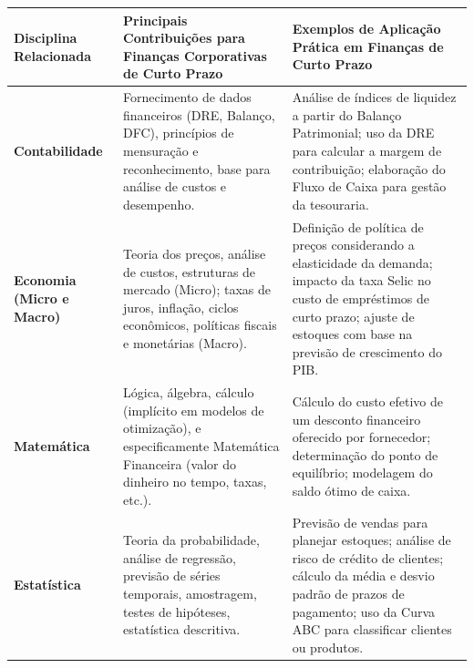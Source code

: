 \documentclass[
  a4paper,
]{book}
\begin{document}
\begin{longtable}[]{@{}
  >{\raggedright\arraybackslash}p{}
  >{\raggedright\arraybackslash}p{}
  >{\raggedright\arraybackslash}p{}@{}}
\toprule\noalign{}
\begin{minipage}[b]{\linewidth}\raggedright
Disciplina Relacionada
\end{minipage} & \begin{minipage}[b]{\linewidth}\raggedright
Principais Contribuições para Finanças Corporativas de Curto Prazo
\end{minipage} & \begin{minipage}[b]{\linewidth}\raggedright
Exemplos de Aplicação Prática em Finanças de Curto Prazo
\end{minipage} \\
\midrule\noalign{}
\endhead
\bottomrule\noalign{}
\endlastfoot
\textbf{Contabilidade} & Fornecimento de dados financeiros (DRE,
Balanço, DFC), princípios de mensuração e reconhecimento, base para
análise de custos e desempenho. & Análise de índices de liquidez a
partir do Balanço Patrimonial; uso da DRE para calcular a margem de
contribuição; elaboração do Fluxo de Caixa para gestão da tesouraria. \\
\textbf{Economia (Micro e Macro)} & Teoria dos preços, análise de
custos, estruturas de mercado (Micro); taxas de juros, inflação, ciclos
econômicos, políticas fiscais e monetárias (Macro). & Definição de
política de preços considerando a elasticidade da demanda; impacto da
taxa Selic no custo de empréstimos de curto prazo; ajuste de estoques
com base na previsão de crescimento do PIB. \\
\textbf{Matemática} & Lógica, álgebra, cálculo (implícito em modelos de
otimização), e especificamente Matemática Financeira (valor do dinheiro
no tempo, taxas, etc.). & Cálculo do custo efetivo de um desconto
financeiro oferecido por fornecedor; determinação do ponto de
equilíbrio; modelagem do saldo ótimo de caixa. \\
\textbf{Estatística} & Teoria da probabilidade, análise de regressão,
previsão de séries temporais, amostragem, testes de hipóteses,
estatística descritiva. & Previsão de vendas para planejar estoques;
análise de risco de crédito de clientes; cálculo da média e desvio
padrão de prazos de pagamento; uso da Curva ABC para classificar
clientes ou produtos. \\
\end{longtable}
\end{document}
